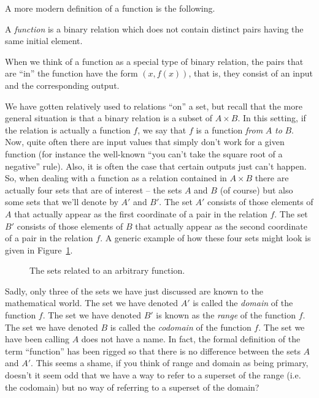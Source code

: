 A more modern definition of a function is the following.

\begin{defi}
 A \emph{function} is a binary relation which does not contain
distinct pairs having the same initial element.
\end{defi}

When we think of a function as a special type of binary relation, 
the pairs that are ``in'' the function have the form $(x, f(x))$,
that is, they consist of an input and the corresponding output.

We have gotten relatively used to relations ``on'' a set, but recall
that the more general situation is that a binary relation is 
a subset of $A \times B$.  In this setting, if the relation is 
actually a function $f$, we say that $f$ is a function \emph{from} $A$
\emph{to} $B$.  Now, quite often there are input values  that simply don't 
work for a given function (for instance the well-known ``you can't take
the square root of a negative'' rule).  Also, it is often the case that
certain outputs just can't happen.  So, when dealing with a function
as a relation contained in $A \times B$ there are actually four sets
that are of interest -- the sets $A$ and $B$ (of course) but also some
sets that we'll denote by $A'$ and $B'$.  The set $A'$ consists of those
elements of $A$ that actually appear as the first coordinate of a pair
in the relation $f$.  The set $B'$ consists of those elements of $B$
that actually appear as the second coordinate of a pair in the relation $f$.
A generic example of how these four sets might look is given in Figure~\ref{fig:generic_function}.

\begin{figure}[!hbtp]

\caption{The sets related to an arbitrary function.}
\label{fig:generic_function} 
\end{figure}

Sadly, only three of the sets we have just discussed are known to
the mathematical world.  The set we have denoted $A'$ is called the
\emph{domain} of the function $f$.  The set we have denoted $B'$ is 
known as the \emph{range} of the function $f$.  The set we have denoted
$B$ is called the \emph{codomain} of the function $f$.  The set we 
have been calling $A$ does not have a name.  In fact, the formal
definition of the term ``function'' has been rigged so that there
is no difference between the sets $A$ and $A'$.  This seems a shame,
if you think of range and domain as being primary, doesn't it seem
odd that we have a way to refer to a superset of the range (i.e. the 
codomain) but no way of referring to a superset of the domain?

